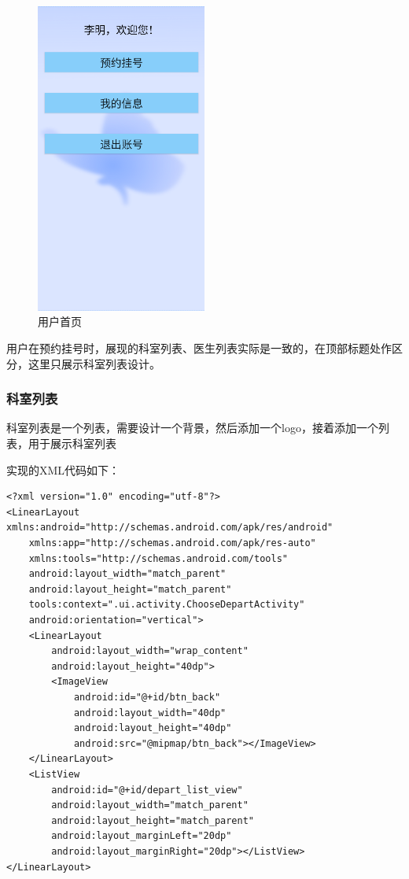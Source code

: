 \documentclass[UTF8,12pt]{article}
\begin{document}
\begin{figure}[htbp]
    \centering
    \includegraphics[width=0.5\textwidth]{imgs/13.png}
    \caption{用户首页}
\end{figure}

用户在预约挂号时，展现的科室列表、医生列表实际是一致的，在顶部标题处作区分，这里只展示科室列表设计。

\subsubsection{科室列表}
科室列表是一个列表，需要设计一个背景，然后添加一个logo，接着添加一个列表，用于展示科室列表

实现的XML代码如下：

\newpage

\begin{lstlisting}
<?xml version="1.0" encoding="utf-8"?>
<LinearLayout xmlns:android="http://schemas.android.com/apk/res/android"
    xmlns:app="http://schemas.android.com/apk/res-auto"
    xmlns:tools="http://schemas.android.com/tools"
    android:layout_width="match_parent"
    android:layout_height="match_parent"
    tools:context=".ui.activity.ChooseDepartActivity"
    android:orientation="vertical">
    <LinearLayout
        android:layout_width="wrap_content"
        android:layout_height="40dp">
        <ImageView
            android:id="@+id/btn_back"
            android:layout_width="40dp"
            android:layout_height="40dp"
            android:src="@mipmap/btn_back"></ImageView>
    </LinearLayout>
    <ListView
        android:id="@+id/depart_list_view"
        android:layout_width="match_parent"
        android:layout_height="match_parent"
        android:layout_marginLeft="20dp"
        android:layout_marginRight="20dp"></ListView>
</LinearLayout>
\end{lstlisting}
\end{document}
